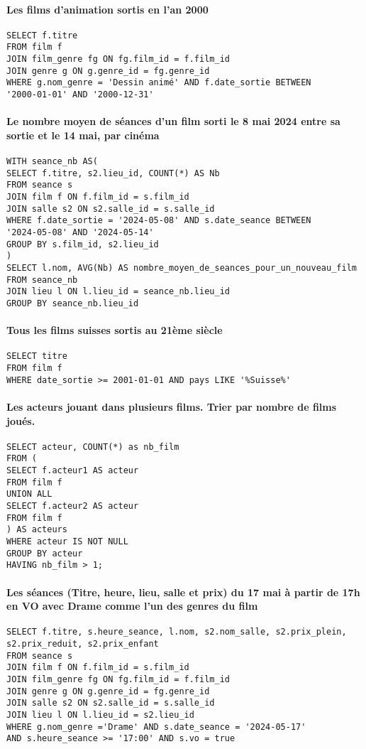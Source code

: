 \documentclass[12pt]{article}
\begin{document}
\paragraph*{Les films d'animation sortis en l'an 2000}
\begin{verbatim}
SELECT f.titre
FROM film f  
JOIN film_genre fg ON fg.film_id = f.film_id  
JOIN genre g ON g.genre_id = fg.genre_id  
WHERE g.nom_genre = 'Dessin animé' AND f.date_sortie BETWEEN 
'2000-01-01' AND '2000-12-31' 
\end{verbatim}
\paragraph*{Le nombre moyen de séances d'un film sorti le 8 mai 2024 entre sa sortie et le 14 mai, par cinéma}
\begin{verbatim}
WITH seance_nb AS( 
SELECT f.titre, s2.lieu_id, COUNT(*) AS Nb 
FROM seance s  
JOIN film f ON f.film_id = s.film_id  
JOIN salle s2 ON s2.salle_id = s.salle_id  
WHERE f.date_sortie = '2024-05-08' AND s.date_seance BETWEEN 
'2024-05-08' AND '2024-05-14' 
GROUP BY s.film_id, s2.lieu_id  
) 
SELECT l.nom, AVG(Nb) AS nombre_moyen_de_seances_pour_un_nouveau_film 
FROM seance_nb 
JOIN lieu l ON l.lieu_id = seance_nb.lieu_id 
GROUP BY seance_nb.lieu_id 
\end{verbatim}
\paragraph*{Tous les films suisses sortis au 21ème siècle}
\begin{verbatim}
SELECT titre 
FROM film f  
WHERE date_sortie >= 2001-01-01 AND pays LIKE '%Suisse%' 
\end{verbatim}
\pagebreak
\paragraph*{Les acteurs jouant dans plusieurs films. Trier par nombre de films joués.}
\begin{verbatim}
SELECT acteur, COUNT(*) as nb_film  
FROM (  
SELECT f.acteur1 AS acteur  
FROM film f  
UNION ALL  
SELECT f.acteur2 AS acteur  
FROM film f  
) AS acteurs  
WHERE acteur IS NOT NULL  
GROUP BY acteur  
HAVING nb_film > 1; 
\end{verbatim}
\paragraph*{Les séances (Titre, heure, lieu, salle et prix) du 17 mai à partir de 17h en VO avec Drame comme l'un des genres du film}
\begin{verbatim}
SELECT f.titre, s.heure_seance, l.nom, s2.nom_salle, s2.prix_plein, 
s2.prix_reduit, s2.prix_enfant  
FROM seance s  
JOIN film f ON f.film_id = s.film_id  
JOIN film_genre fg ON fg.film_id = f.film_id  
JOIN genre g ON g.genre_id = fg.genre_id  
JOIN salle s2 ON s2.salle_id = s.salle_id  
JOIN lieu l ON l.lieu_id = s2.lieu_id  
WHERE g.nom_genre ='Drame' AND s.date_seance = '2024-05-17' 
AND s.heure_seance >= '17:00' AND s.vo = true 
\end{verbatim}
\pagebreak
\end{document}
